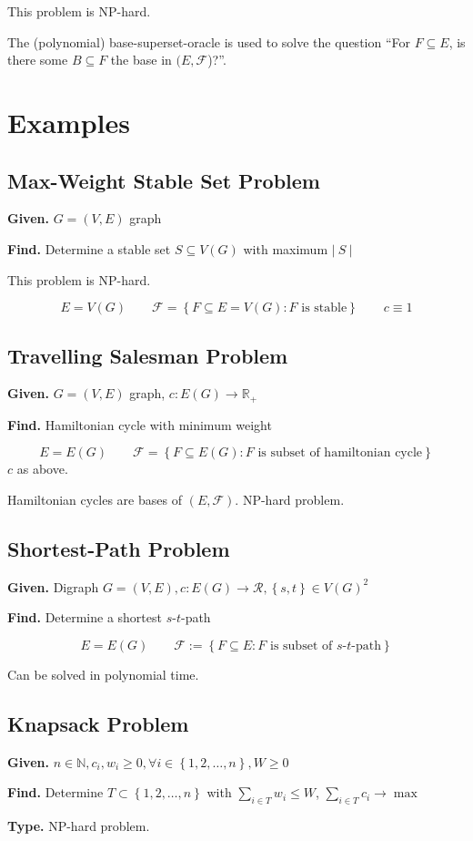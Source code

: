 \documentclass[a4paper]{article}
\theoremstyle{definition}
\newcommand{\card}[1]{\left|\:\!#1\:\!\right|}
\newcommand{\set}[1]{\left\{#1\right\}}
\newcommand{\given}[1]{\textbf{Given.} #1\par}
\newcommand{\find}[1]{\textbf{Find.} #1\par}
\newcommand{\gath}[2]{$#1$-$#2$-path} %
\begin{document}
This problem is NP-hard.

The (polynomial) base-superset-oracle is used to solve the question ``For $F \subseteq E$, is there some $B \subseteq F$ the base in $(E, \mathcal{F}$)?''.

\section{Examples}
\subsection{Max-Weight Stable Set Problem}
%
\given{$G = (V, E)$ graph}
\find{Determine a stable set $S \subseteq V(G)$ with maximum $\card{S}$}

This problem is NP-hard.

\[ E = V(G)  \qquad  \mathcal{F} = \set{F \subseteq E = V(G): F \text{ is stable}} \qquad c \equiv 1 \]

\subsection{Travelling Salesman Problem}
%
\given{$G = (V, E)$ graph, $c: E(G) \rightarrow \mathbb{R}_+$}
\find{Hamiltonian cycle with minimum weight}

\[ E = E(G)  \qquad  \mathcal{F} = \set{F \subseteq E(G): F \text{ is subset of hamiltonian cycle}} \]
$c$ as above.

Hamiltonian cycles are bases of $(E, \mathcal{F})$. NP-hard problem.

\subsection{Shortest-Path Problem}
%
\given{Digraph $G = (V, E), c: E(G) \rightarrow \mathcal{R}, \set{s, t} \in V(G)^2$}
\find{Determine a shortest \gath st}

\[
  E = E(G) \qquad
  \mathcal{F} := \set{F \subseteq E: F \text{ is subset of \gath st}}
\]

Can be solved in polynomial time.

\subsection{Knapsack Problem}
%
\given{$n \in \mathbb{N}, c_i, w_i \geq 0, \forall i \in \set{1, 2, \ldots, n}, W \geq 0$}
\find{Determine $T \subset \set{1, 2, \ldots, n}$ with $\sum_{i \in T} w_i \leq W$, $\sum_{i \in T} c_i \rightarrow \max$}
\textbf{Type.} NP-hard problem.\par
\end{document}
